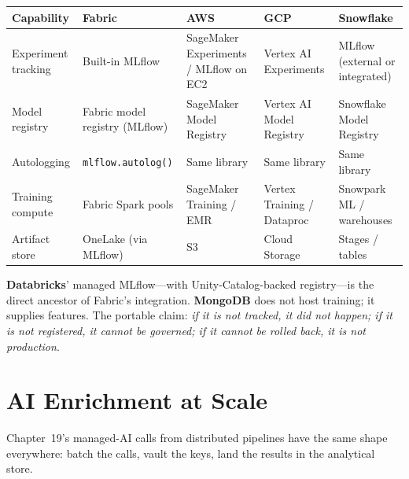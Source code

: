 \begin{center}
\footnotesize
\begin{tabular}{@{}p{2.8cm}p{3.2cm}p{3.2cm}p{3.2cm}p{3.2cm}@{}}
\toprule
\textbf{Capability} & \textbf{Fabric} & \textbf{AWS} & \textbf{GCP} & \textbf{Snowflake} \\
\midrule
Experiment tracking & Built-in MLflow & SageMaker Experiments / MLflow on EC2 & Vertex AI Experiments & MLflow (external or integrated) \\
Model registry & Fabric model registry (MLflow) & SageMaker Model Registry & Vertex AI Model Registry & Snowflake Model Registry \\
Autologging & \texttt{mlflow.autolog()} & Same library & Same library & Same library \\
Training compute & Fabric Spark pools & SageMaker Training / EMR & Vertex Training / Dataproc & Snowpark ML / warehouses \\
Artifact store & OneLake (via MLflow) & S3 & Cloud Storage & Stages / tables \\
\bottomrule
\end{tabular}
\end{center}

\noindent \textbf{Databricks}' managed MLflow---with Unity-Catalog-backed registry---is the
direct ancestor of Fabric's integration. \textbf{MongoDB} does not host training; it supplies
features. The portable claim: \emph{if it is not tracked, it did not happen; if it is not
registered, it cannot be governed; if it cannot be rolled back, it is not production}.

\section{AI Enrichment at Scale}
%
Chapter~19's managed-AI calls from distributed pipelines have the same shape everywhere: batch
the calls, vault the keys, land the results in the analytical store.

